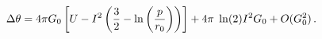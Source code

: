 \begin{equation}
\label{deflection}
\Delta\theta = 4 \pi G_0 \left[ U- I^2 \left( \frac{3}{2} -
\ln\left(\frac{p}{r_0}\right) \right) \right] + 4 \pi \hspace{0.1cm}
\ln (2) I^2
G_0 + O(G_0 ^2) \, .
\end{equation}

